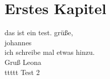 \documentclass{article}
\begin{document}
\section{Erstes Kapitel}

das ist ein test. gr\"u{\ss}e,\\

johannes\\

ich schreibe mal etwas hinzu.\\

Gruß Leona\\

ttttt
Test 2
\end{document}
